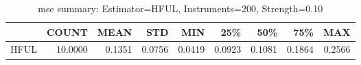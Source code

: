 \begin{table}[ht]
\centering
\caption{mse summary: Estimator=HFUL, Instruments=200, Strength=0.10}
\begin{tabular}{lrrrrrrrr}
\toprule
 & COUNT & MEAN & STD & MIN & 25\% & 50\% & 75\% & MAX \\
\midrule
HFUL & 10.0000 & 0.1351 & 0.0756 & 0.0419 & 0.0923 & 0.1081 & 0.1864 & 0.2566 \\
\bottomrule
\end{tabular}
\end{table}
